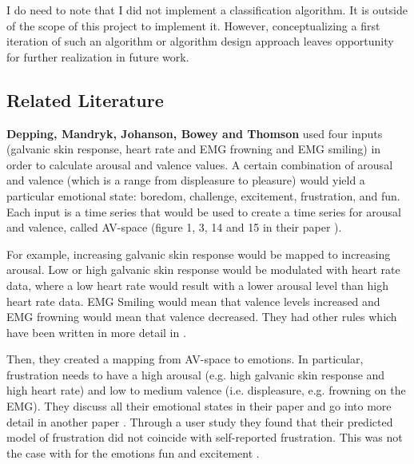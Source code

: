 I do need to note that I did not implement a classification algorithm. It is outside of the scope of this project to implement it. However, conceptualizing a first iteration of such an algorithm or algorithm design approach leaves opportunity for further realization in future work.

\subsection{Related Literature}

\textbf{Depping, Mandryk, Johanson, Bowey and Thomson} used four inputs (galvanic skin response, heart rate and EMG frowning and EMG smiling) in order to calculate arousal and valence values. A certain combination of arousal and valence (which is a range from displeasure to pleasure) would yield a particular emotional state: boredom, challenge, excitement, frustration, and fun. Each input is a time series that would be used to create a time series for arousal and valence, called AV-space (figure 1, 3, 14 and 15 in their paper \cite{mandryk2007}). 

For example, increasing galvanic skin response would be mapped to increasing arousal. Low or high galvanic skin response would be modulated with heart rate data, where a low heart rate would result with a lower arousal level than high heart rate data. EMG Smiling would mean that valence levels increased and EMG frowning would mean that valence decreased. They had other rules which have been written in more detail in \cite{mandryk2007}.

Then, they created a mapping from AV-space to emotions. In particular, frustration needs to have a high arousal (e.g. high galvanic skin response and high heart rate) and low to medium valence (i.e. displeasure, e.g. frowning on the EMG). They discuss all their emotional states in their paper \cite{mandryk2006} and go into more detail in another paper \cite{mandryk2007}. Through a user study they found that their predicted model of frustration did not coincide with self-reported frustration. This was not the case with for the emotions fun and excitement \cite{mandryk2006}.


